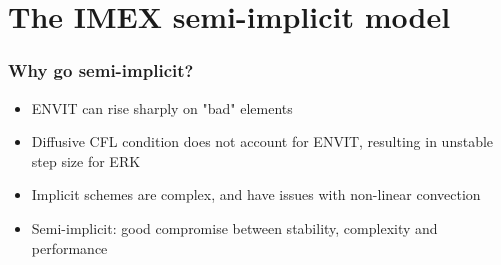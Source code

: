 
    
    \section{The IMEX semi-implicit model}
    

    \begin{frame}
		\frametitle{Why go semi-implicit?}
		\begin{itemize}
			\item ENVIT can rise sharply on "bad" elements
			\item Diffusive CFL condition does not account for ENVIT, resulting in unstable step size for ERK
			\item Implicit schemes are complex, and have issues with non-linear convection
			\item Semi-implicit: good compromise between stability, complexity and performance
		\end{itemize}
    \end{frame}